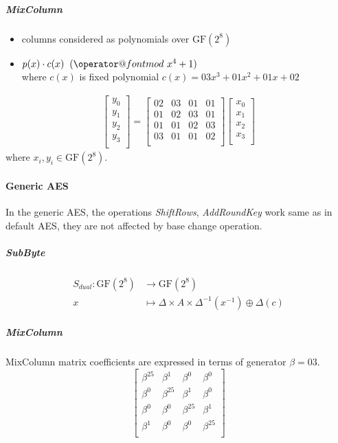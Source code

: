 \documentclass[11pt,oneside,final]{fithesis2}
\makeatletter
\def\imod#1{\allowbreak\mkern10mu({\operator@font mod}\,\,#1)}
\newcommand{\gfe}{\ensuremath{\text{GF}\left(2^8\right)}}
\makeatother
\begin{document}
	\subparagraph*{MixColumn}
	    \begin{itemize}
	    \item columns considered as polynomials over $\gfe$
	    \item $p(x) \cdot c(x) \imod{x^4+1}$\\
	    where $c(x)$ is fixed polynomial $c(x) = 03x^3+01x^2 + 01x + 02$
	    \end{itemize}
	    \begin{align}
		\begin{bmatrix}
		    y_0\\
		    y_1\\
		    y_2\\
		    y_3\\
		\end{bmatrix}
		    =	
		\begin{bmatrix}
		    02 & 03 & 01 & 01\\
		    01 & 02 & 03 & 01\\
		    01 & 01 & 02 & 03\\
		    03 & 01 & 01 & 02\\
		\end{bmatrix}
		\begin{bmatrix}
		    x_0\\
		    x_1\\
		    x_2\\
		    x_3\\
		\end{bmatrix}
	    \end{align}
	where $x_i, y_i \in \gfe$.
	
	\paragraph*{Generic AES}
	In the generic AES, the operations \emph{ShiftRows}, \emph{AddRoundKey} work same as in default AES, they are not affected by base change operation.

	\subparagraph*{SubByte}\label{sec:aes_generic_subbyte}
	\begin{equation}
	\begin{aligned}
	S_{dual}: \gfe           & \longrightarrow  \gfe\\
	x                        & \longmapsto \Delta \times A \times \Delta^{-1} \left( x^{-1} \right) \oplus \Delta \left(c\right)
	\end{aligned}
	\end{equation}

	\subparagraph*{MixColumn}
	MixColumn matrix coefficients are expressed in terms of generator $\beta = 03$.
	\[
	\begin{bmatrix}
		    \beta^{25} & \beta^{1} & \beta^{0} & \beta^{0}\\
		    \beta^{0} & \beta^{25} & \beta^{1} & \beta^{0}\\
		    \beta^{0} & \beta^{0} & \beta^{25} & \beta^{1}\\
		    \beta^{1} & \beta^{0} & \beta^{0} & \beta^{25}\\
	\end{bmatrix}
	\]
\end{document}
